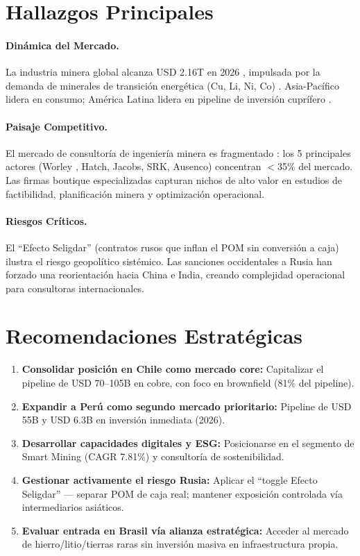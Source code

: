 \section{Hallazgos Principales}

\paragraph{Dinámica del Mercado.} La industria minera global alcanza USD 2.16T en 2026 \cite{researchandmarkets2026}, impulsada por la demanda de minerales de transición energética (Cu, Li, Ni, Co) \cite{iea2026}. Asia-Pacífico lidera en consumo; América Latina lidera en pipeline de inversión cuprífero \cite{bnamericas2026}.

\paragraph{Paisaje Competitivo.} El mercado de consultoría de ingeniería minera es fragmentado \cite{dataintelo2025}: los 5 principales actores (Worley \cite{worley2025}, Hatch, Jacobs, SRK, Ausenco) concentran $<$35\% del mercado. Las firmas boutique especializadas capturan nichos de alto valor en estudios de factibilidad, planificación minera y optimización operacional.

\paragraph{Riesgos Críticos.} El ``Efecto Seligdar'' (contratos rusos \cite{seligdar2025} que inflan el POM sin conversión a caja) ilustra el riesgo geopolítico sistémico. Las sanciones occidentales a Rusia han forzado una reorientación hacia China e India, creando complejidad operacional para consultoras internacionales.

\section{Recomendaciones Estratégicas}

\begin{recommendationbox}
\begin{enumerate}
    \item \textbf{Consolidar posición en Chile como mercado core:} Capitalizar el pipeline de USD 70--105B en cobre, con foco en brownfield (81\% del pipeline).
    \item \textbf{Expandir a Perú como segundo mercado prioritario:} Pipeline de USD 55B y USD 6.3B en inversión inmediata (2026).
    \item \textbf{Desarrollar capacidades digitales y ESG:} Posicionarse en el segmento de Smart Mining (CAGR 7.81\%) y consultoría de sostenibilidad.
    \item \textbf{Gestionar activamente el riesgo Rusia:} Aplicar el ``toggle Efecto Seligdar'' — separar POM de caja real; mantener exposición controlada vía intermediarios asiáticos.
    \item \textbf{Evaluar entrada en Brasil vía alianza estratégica:} Acceder al mercado de hierro/litio/tierras raras sin inversión masiva en infraestructura propia.
\end{enumerate}
\end{recommendationbox}
